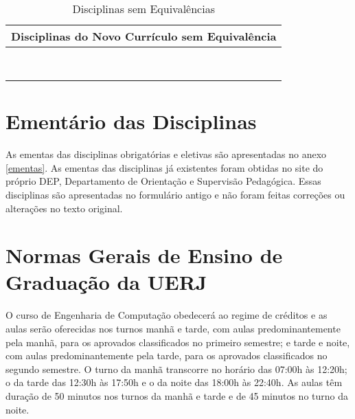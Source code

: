 \begin{table}
	\centering
	\renewcommand{\arraystretch}{1.5}
	\caption{Disciplinas sem Equivalências}
	\label{DiscSemEqui}
	\begin{tabularx}{\textwidth}{|X|}
		\hline
		{\textbf{Disciplinas do Novo Currículo sem Equivalência}} \\
		\hline
		\LogProg                                                  \\
		\IC                                                       \\
		\EngCompSoc                                               \\
		\MineraDados                                              \\
		\SistEmb                                                  \\
		\ProcImag                                                 \\
		\CompParal                                                \\
		\EstSup                                                   \\
		\hline
	\end{tabularx}
\end{table}

\section{Ementário das Disciplinas}
As ementas das disciplinas obrigatórias e eletivas são apresentadas no anexo \ref{ementas}. As ementas das disciplinas já existentes foram obtidas no site do próprio DEP, Departamento de Orientação e Supervisão Pedagógica. Essas disciplinas são apresentadas no formulário antigo e não foram feitas correções ou alterações no texto original.

\section{Normas Gerais de Ensino de Graduação da UERJ}
O curso de Engenharia de Computação obedecerá ao regime de créditos e as aulas serão oferecidas nos turnos manhã e tarde, com aulas predominantemente pela manhã, para os aprovados classificados no primeiro semestre; e tarde e noite, com aulas predominantemente pela tarde, para os aprovados classificados no segundo semestre. O turno da manhã transcorre no horário das 07:00h às 12:20h; o da tarde das 12:30h às 17:50h e o da noite das 18:00h às 22:40h. As aulas têm duração de 50 minutos nos turnos da manhã e tarde e de 45 minutos no turno da noite.


